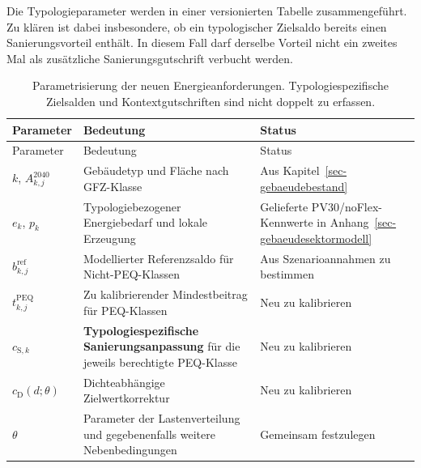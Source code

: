 \documentclass[
  ngerman,
  a4paper,
  DIV=11]{scrreprt}
\begin{document}
Die Typologieparameter werden in einer versionierten Tabelle
zusammengeführt. Zu klären ist dabei insbesondere, ob ein typologischer
Zielsaldo bereits einen Sanierungsvorteil enthält. In diesem Fall darf
derselbe Vorteil nicht ein zweites Mal als zusätzliche
Sanierungsgutschrift verbucht werden.

\begin{longtable}[]{@{}
  >{\raggedright\arraybackslash}p{}
  >{\raggedright\arraybackslash}p{}
  >{\raggedright\arraybackslash}p{}@{}}
\caption{Parametrisierung der neuen Energieanforderungen.
Typologiespezifische Zielsalden und Kontextgutschriften sind nicht
doppelt zu erfassen.}\label{tbl-kalibrierparameter}\tabularnewline
\toprule\noalign{}
\begin{minipage}[b]{\linewidth}\raggedright
Parameter
\end{minipage} & \begin{minipage}[b]{\linewidth}\raggedright
Bedeutung
\end{minipage} & \begin{minipage}[b]{\linewidth}\raggedright
Status
\end{minipage} \\
\midrule\noalign{}
\endfirsthead
\toprule\noalign{}
\begin{minipage}[b]{\linewidth}\raggedright
Parameter
\end{minipage} & \begin{minipage}[b]{\linewidth}\raggedright
Bedeutung
\end{minipage} & \begin{minipage}[b]{\linewidth}\raggedright
Status
\end{minipage} \\
\midrule\noalign{}
\endhead
\bottomrule\noalign{}
\endlastfoot
\(k\), \(A_{k,j}^{2040}\) & Gebäudetyp und Fläche nach GFZ-Klasse & Aus
Kapitel~\ref{sec-gebaeudebestand} \\
\(e_k\), \(p_k\) & Typologiebezogener Energiebedarf und lokale Erzeugung
& Gelieferte PV30/noFlex-Kennwerte in
Anhang~\ref{sec-gebaeudesektormodell} \\
\(b_{k,j}^{\mathrm{ref}}\) & Modellierter Referenzsaldo für
Nicht-PEQ-Klassen & Aus Szenarioannahmen zu bestimmen \\
\(t_{k,j}^{\mathrm{PEQ}}\) & Zu kalibrierender Mindestbeitrag für
PEQ-Klassen & Neu zu kalibrieren \\
\(c_{\mathrm{S},k}\) & \textbf{Typologiespezifische Sanierungsanpassung}
für die jeweils berechtigte PEQ-Klasse & Neu zu kalibrieren \\
\(c_{\mathrm{D}}(d;\theta)\) & Dichteabhängige Zielwertkorrektur & Neu
zu kalibrieren \\
\(\theta\) & Parameter der Lastenverteilung und gegebenenfalls weitere
Nebenbedingungen & Gemeinsam festzulegen \\
\end{longtable}
\end{document}
